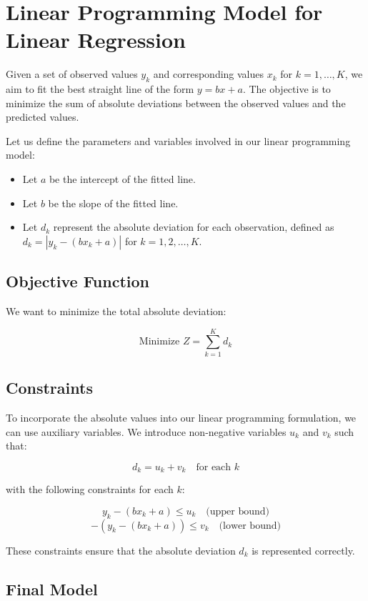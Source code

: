 \documentclass{article}
\begin{document}
\section*{Linear Programming Model for Linear Regression}

Given a set of observed values \( y_k \) and corresponding values \( x_k \) for \( k = 1, \ldots, K \), we aim to fit the best straight line of the form \( y = bx + a \). The objective is to minimize the sum of absolute deviations between the observed values and the predicted values.

Let us define the parameters and variables involved in our linear programming model:

\begin{itemize}
    \item Let \( a \) be the intercept of the fitted line.
    \item Let \( b \) be the slope of the fitted line.
    \item Let \( d_k \) represent the absolute deviation for each observation, defined as \( d_k = |y_k - (bx_k + a)| \) for \( k = 1, 2, \ldots, K \).
\end{itemize}

\subsection*{Objective Function}

We want to minimize the total absolute deviation:

\[
\text{Minimize } Z = \sum_{k=1}^{K} d_k
\]

\subsection*{Constraints}

To incorporate the absolute values into our linear programming formulation, we can use auxiliary variables. We introduce non-negative variables \( u_k \) and \( v_k \) such that:

\[
d_k = u_k + v_k \quad \text{for each } k
\]

with the following constraints for each \( k \):

\[
y_k - (bx_k + a) \leq u_k \quad \text{(upper bound)}
\]
\[
-(y_k - (bx_k + a)) \leq v_k \quad \text{(lower bound)}
\]

These constraints ensure that the absolute deviation \( d_k \) is represented correctly.

\subsection*{Final Model}
\end{document}
